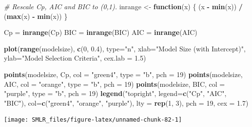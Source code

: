 \documentclass[
]{book}
\newenvironment{Shaded}{\begin{snugshade}}{\end{snugshade}}
\newcommand{\AttributeTok}[1]{\textcolor[rgb]{0.13,0.29,0.53}{#1}}
\newcommand{\CommentTok}[1]{\textcolor[rgb]{0.56,0.35,0.01}{\textit{#1}}}
\newcommand{\ControlFlowTok}[1]{\textcolor[rgb]{0.13,0.29,0.53}{\textbf{#1}}}
\newcommand{\DecValTok}[1]{\textcolor[rgb]{0.00,0.00,0.81}{#1}}
\newcommand{\FloatTok}[1]{\textcolor[rgb]{0.00,0.00,0.81}{#1}}
\newcommand{\FunctionTok}[1]{\textcolor[rgb]{0.13,0.29,0.53}{\textbf{#1}}}
\newcommand{\NormalTok}[1]{#1}
\newcommand{\OtherTok}[1]{\textcolor[rgb]{0.56,0.35,0.01}{#1}}
\newcommand{\SpecialCharTok}[1]{\textcolor[rgb]{0.81,0.36,0.00}{\textbf{#1}}}
\newcommand{\StringTok}[1]{\textcolor[rgb]{0.31,0.60,0.02}{#1}}
\theoremstyle{definition}
\theoremstyle{definition}
\theoremstyle{definition}
\theoremstyle{definition}
\theoremstyle{remark}
\begin{document}
\begin{Shaded}
\begin{Highlighting}[]
    \CommentTok{\# Rescale Cp, AIC and BIC to (0,1).}
\NormalTok{    inrange }\OtherTok{\textless{}{-}} \ControlFlowTok{function}\NormalTok{(x) \{ (x }\SpecialCharTok{{-}} \FunctionTok{min}\NormalTok{(x)) }\SpecialCharTok{/}\NormalTok{ (}\FunctionTok{max}\NormalTok{(x) }\SpecialCharTok{{-}} \FunctionTok{min}\NormalTok{(x)) \}}
    
\NormalTok{    Cp }\OtherTok{=} \FunctionTok{inrange}\NormalTok{(Cp)}
\NormalTok{    BIC }\OtherTok{=} \FunctionTok{inrange}\NormalTok{(BIC)}
\NormalTok{    AIC }\OtherTok{=} \FunctionTok{inrange}\NormalTok{(AIC)}

    \FunctionTok{plot}\NormalTok{(}\FunctionTok{range}\NormalTok{(modelsize), }\FunctionTok{c}\NormalTok{(}\DecValTok{0}\NormalTok{, }\FloatTok{0.4}\NormalTok{), }\AttributeTok{type=}\StringTok{"n"}\NormalTok{, }
         \AttributeTok{xlab=}\StringTok{"Model Size (with Intercept)"}\NormalTok{, }
         \AttributeTok{ylab=}\StringTok{"Model Selection Criteria"}\NormalTok{, }\AttributeTok{cex.lab =} \FloatTok{1.5}\NormalTok{)}

    \FunctionTok{points}\NormalTok{(modelsize, Cp, }\AttributeTok{col =} \StringTok{"green4"}\NormalTok{, }\AttributeTok{type =} \StringTok{"b"}\NormalTok{, }\AttributeTok{pch =} \DecValTok{19}\NormalTok{)}
    \FunctionTok{points}\NormalTok{(modelsize, AIC, }\AttributeTok{col =} \StringTok{"orange"}\NormalTok{, }\AttributeTok{type =} \StringTok{"b"}\NormalTok{, }\AttributeTok{pch =} \DecValTok{19}\NormalTok{)}
    \FunctionTok{points}\NormalTok{(modelsize, BIC, }\AttributeTok{col =} \StringTok{"purple"}\NormalTok{, }\AttributeTok{type =} \StringTok{"b"}\NormalTok{, }\AttributeTok{pch =} \DecValTok{19}\NormalTok{)}
    \FunctionTok{legend}\NormalTok{(}\StringTok{"topright"}\NormalTok{, }\AttributeTok{legend=}\FunctionTok{c}\NormalTok{(}\StringTok{"Cp"}\NormalTok{, }\StringTok{"AIC"}\NormalTok{, }\StringTok{"BIC"}\NormalTok{),}
           \AttributeTok{col=}\FunctionTok{c}\NormalTok{(}\StringTok{"green4"}\NormalTok{, }\StringTok{"orange"}\NormalTok{, }\StringTok{"purple"}\NormalTok{), }
           \AttributeTok{lty =} \FunctionTok{rep}\NormalTok{(}\DecValTok{1}\NormalTok{, }\DecValTok{3}\NormalTok{), }\AttributeTok{pch =} \DecValTok{19}\NormalTok{, }\AttributeTok{cex =} \FloatTok{1.7}\NormalTok{)}
\end{Highlighting}
\end{Shaded}

\begin{center}\texttt{[image: SMLR\_files/figure-latex/unnamed-chunk-82-1]} \end{center}
\end{document}
